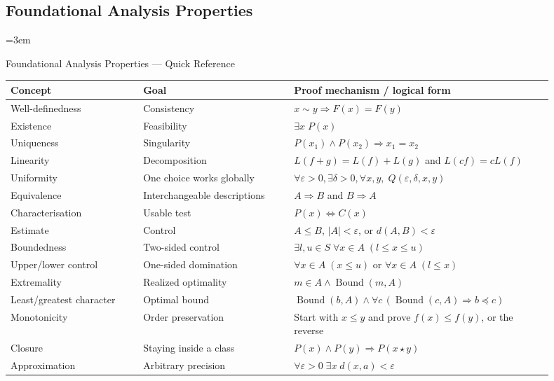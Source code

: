 
\subsection{Foundational Analysis Properties}
\label{sec:foundational-analysis-properties}

\begingroup
\sloppy
\emergencystretch=3em

\begin{toolkitbox}{Foundational Analysis Properties --- Quick Reference}
\small
\begin{tabular}{p{0.22\linewidth} p{0.25\linewidth} p{0.43\linewidth}}
\toprule
\textbf{Concept} & \textbf{Goal} & \textbf{Proof mechanism / logical form} \\
\midrule
Well-definedness
  & Consistency
  & $x\sim y \Rightarrow F(x)=F(y)$ \\
Existence
  & Feasibility
  & $\exists x\;P(x)$ \\
Uniqueness
  & Singularity
  & $P(x_1)\land P(x_2)\Rightarrow x_1=x_2$ \\
Linearity
  & Decomposition
  & $L(f+g)=L(f)+L(g)$ and $L(cf)=cL(f)$ \\
Uniformity
  & One choice works globally
  & $\forall\varepsilon>0,\exists\delta>0,\forall x,y,\;Q(\varepsilon,\delta,x,y)$ \\
Equivalence
  & Interchangeable descriptions
  & $A\Rightarrow B$ and $B\Rightarrow A$ \\
Characterisation
  & Usable test
  & $P(x)\Longleftrightarrow C(x)$ \\
Estimate
  & Control
  & $A\leq B$, $|A|<\varepsilon$, or $d(A,B)<\varepsilon$ \\
Boundedness
  & Two-sided control
  & $\exists l,u\in S\;\forall x\in A\;(l\leq x\leq u)$ \\
Upper/lower control
  & One-sided domination
  & $\forall x\in A\;(x\leq u)$ or $\forall x\in A\;(l\leq x)$ \\
Extremality
  & Realized optimality
  & $m\in A\land \operatorname{Bound}(m,A)$ \\
Least/greatest character
  & Optimal bound
  & $\operatorname{Bound}(b,A)\land \forall c\,(\operatorname{Bound}(c,A)\Rightarrow b\preceq c)$ \\
Monotonicity
  & Order preservation
  & Start with $x\leq y$ and prove $f(x)\leq f(y)$, or the reverse \\
Closure
  & Staying inside a class
  & $P(x)\land P(y)\Rightarrow P(x\star y)$ \\
Approximation
  & Arbitrary precision
  & $\forall\varepsilon>0\;\exists x\;d(x,a)<\varepsilon$ \\
\bottomrule
\end{tabular}
\end{toolkitbox}

